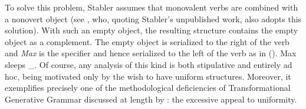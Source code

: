 \eal
{}
\zl
To solve this problem, Stabler assumes that monovalent verbs are combined with a nonovert object
(see \citet[, 124]{Veenstra98a}, who, quoting Stabler's unpublished work, also adopts this
solution). 
With such an empty object, the resulting structure
contains the empty object as a complement. The empty object is serialized to the right of the verb
and \emph{Max} is the specifier and hence serialized to the left of the verb as in ().
\ea
\label{Beispiel-leeres-Element-intransitive-Verben}
Max sleeps \_.
\z
Of course, any analysis of this kind is both stipulative and
entirely ad hoc, being motivated only by the wish to have uniform
structures. Moreover, it exemplifies precisely one of the
methodological deficiencies of Transformational Generative Grammar discussed at length by
\citet[Section~2.1.2]{CJ2005a}: the excessive appeal to uniformity.

